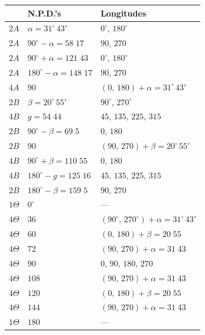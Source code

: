 \documentclass[11pt,a4paper]{article}
\begin{document}
\begin{center}
\small
\begin{tabular}{l@{\qquad}l@{\qquad}l}
 & N.P.D.'s & Longitudes\\\hline
$2A$ & $\alpha = 31^{\circ}\,43'$            & $0^{\circ}$, $180^{\circ}$\\
$2A$ & $90^{\circ} - \alpha = 58\;17$         & $90$, $270$\\
$2A$ & $90^{\circ} + \alpha = 121\;43$        & $0^{\circ}$, $180^{\circ}$\\
$2A$ & $180^{\circ} - \alpha = 148\;17$       & $90$, $270$\\
$4A$ & $90$                                   & $(0,\,180) + \alpha = 31^{\circ}\,43'$\\
$2B$ & $\beta = 20^{\circ}\,55'$              & $90^{\circ}$, $270^{\circ}$\\
$4B$ & $g = 54\;44$                           & $45$, $135$, $225$, $315$\\
$2B$ & $90^{\circ} - \beta = 69\;5$           & $0$, $180$\\
$2B$ & $90$                                   & $(90,\,270) + \beta = 20^{\circ}\,55'$\\
$4B$ & $90^{\circ} + \beta = 110\;55$         & $0$, $180$\\
$4B$ & $180^{\circ} - g = 125\;16$            & $45$, $135$, $225$, $315$\\
$2B$ & $180^{\circ} - \beta = 159\;5$         & $90$, $270$\\
$1\Theta$  & $0^{\circ}$                            & ---\\
$4\Theta$  & $36$                                   & $(90^{\circ},\,270^{\circ}) + \alpha = 31^{\circ}\,43'$\\
$4\Theta$  & $60$                                   & $(0,\,180) + \beta = 20\;55$\\
$4\Theta$  & $72$                                   & $(90,\,270) + \alpha = 31\;43$\\
$4\Theta$  & $90$                                   & $0$, $90$, $180$, $270$\\
$4\Theta$  & $108$                                  & $(90,\,270) + \alpha = 31\;43$\\
$4\Theta$  & $120$                                  & $(0,\,180) + \beta = 20\;55$\\
$4\Theta$  & $144$                                  & $(90,\,270) + \alpha = 31\;43$\\
$1\Theta$  & $180$                                  & ---\\
\end{tabular}
\end{center}
\normalsize
\end{document}
